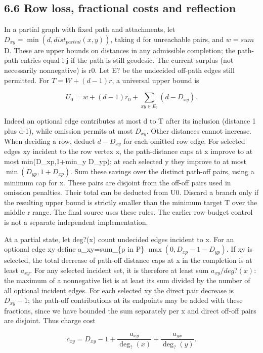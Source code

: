 \documentclass[
  11pt,
]{article}
\begin{document}
\subsection{6.6 Row loss, fractional costs and
reflection}\label{row-loss-fractional-costs-and-reflection}

In a partial graph with fixed path and attachments, let
\(D_{xy}=\operatorname{min}(d,dist_{partial}(x,y))\), taking d for
unreachable pairs, and \(w=sum\) D. These are upper bounds on distances
in any admissible completion; the path-path entries equal
\textbar i-j\textbar{} if the path is still geodesic. The current
surplus (not necessarily nonnegative) is r0. Let E? be the undecided
off-path edges still permitted. For \(T=W+(d-1)r\), a universal upper
bound is

\[U_0=w+(d-1)r_0+\sum_{xy\in E_?}(d-D_{xy}).\]

Indeed an optional edge contributes at most d to T after its inclusion
(distance 1 plus d-1), while omission permits at most \(D_{xy}\). Other
distances cannot increase. When deciding a row, deduct \(d-D_{xy}\) for
each omitted row edge. For selected edges xy incident to the row vertex
x, the path-distance caps at x improve to at most min(D\_xp,1+min\_y
D\_yp); at each selected y they improve to at most
\(\operatorname{min}(D_{yp},1+D_{xp})\). Sum these savings over the
distinct path-off pairs, using a minimum cap for x. These pairs are
disjoint from the off-off pairs used in omission penalties. Their total
can be deducted from U0. Discard a branch only if the resulting upper
bound is strictly smaller than the minimum target T over the middle r
range. The final source uses these rules. The earlier row-budget control
is not a separate independent implementation.

At a partial state, let deg?(x) count undecided edges incident to x. For
an optional edge xy define a\_xy=sum\_\{p in P\}
\(\operatorname{max}(0,D_{xp}-1-D_{yp})\). If xy is selected, the total
decrease of path-off distance caps at x in the completion is at least
\(a_{xy}\). For any selected incident set, it is therefore at least sum
\(a_{xy}/deg?(x)\): the maximum of a nonnegative list is at least its
sum divided by the number of all optional incident edges. For each
selected xy the direct pair decrease is \(D_{xy}-1\); the path-off
contributions at its endpoints may be added with these fractions, since
we have bounded the sum separately per x and direct off-off pairs are
disjoint. Thus charge cost

\[c_{xy}=D_{xy}-1+\frac{a_{xy}}{\deg_?(x)}+\frac{a_{yx}}{\deg_?(y)}.\]
\end{document}
